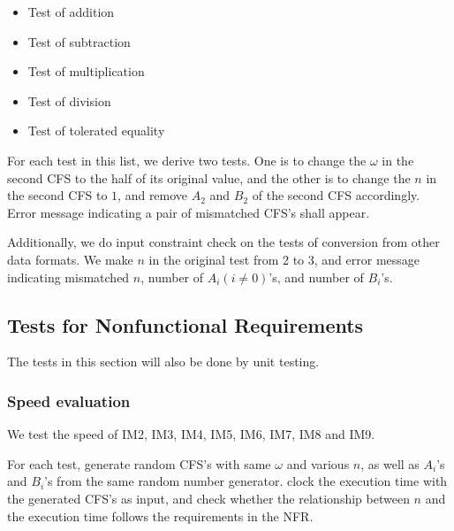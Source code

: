 \documentclass[12pt, titlepage]{article}
\begin{document}
\begin{itemize}
	\item Test of addition
	\item Test of subtraction
	\item Test of multiplication
	\item Test of division
	\item Test of tolerated equality
\end{itemize}

For each test in this list, we derive two tests. One is to change the $\omega$
in the second CFS to the half of its original value, and the other is to change
the $n$ in the second CFS to $1$, and remove $A_2$ and $B_2$ of the second CFS
accordingly. Error message indicating a pair of mismatched CFS's shall appear.
 
Additionally, we do input constraint check on the tests of conversion from other
data formats. We make $n$ in the original test from 2 to 3, and error message
indicating mismatched $n$, number of $A_i(i\neq0)$'s, and number of $B_i$'s.

\subsection{Tests for Nonfunctional Requirements}
The tests in this section will also be done by unit testing.

\subsubsection{Speed evaluation}
We test the speed of IM2, IM3, IM4, IM5, IM6, IM7, IM8 and IM9.	

For each test, generate random CFS's with same $\omega$ and various $n$, as well as $A_i$'s and $B_i$'s from the same random number generator.  clock
the execution time with the generated CFS's as input, and check whether the
relationship between $n$ and the execution time follows the requirements in the
NFR.
\end{document}
